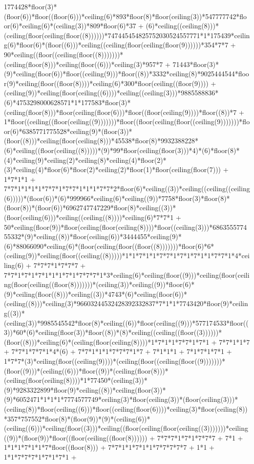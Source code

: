 1774428*floor(3)*(floor(6))*floor((floor(6)))*ceiling(6)*893*floor(8)*floor(ceiling(3))*547777742*floor(6)*ceiling(6)*(ceiling(3))*809*floor(6)*37 + (6)*ceiling((ceiling(8)))*(ceiling(floor(ceiling(floor((8))))))*747445454825752030524557771*1*175439*ceiling(6)*floor(6)*(floor((6)))*ceiling((ceiling(floor(ceiling(floor(9))))))*354*7*7 + 90*ceiling((floor((ceiling(floor((8)))))))*(ceiling(floor(8)))*ceiling(floor((6)))*ceiling(3)*957*7 + 71443*floor(3)*(9)*ceiling(floor(6))*floor((ceiling(9)))*floor((8))*3332*ceiling(8)*9025444544*floor(9)*ceiling(floor((floor(8))))*ceiling(6)*300*floor(ceiling((floor(9)))) + (ceiling(9))*ceiling(floor(ceiling((6))))*ceiling((ceiling(3)))*9885588836*(6)*4753298000628571*1*177583*floor(3)*(ceiling(floor(8)))*floor(ceiling(floor(6)))*floor((floor(ceiling(9))))*floor((8))*7 + 1*floor((ceiling((floor(ceiling((9)))))))*floor((floor(ceiling(floor((ceiling(9)))))))*floor(6)*6385771775528*ceiling(9)*(floor(3))*(floor((8)))*ceiling(floor(ceiling(8)))*45538*floor(8)*9932388228*(6)*ceiling((floor(ceiling((8)))))*(9)*99*floor(ceiling(floor(3)))*4)*(6)*floor(8)*(4)*ceiling(9)*ceiling(2)*ceiling(8)*ceiling(4)*floor(2)*(3)*ceiling(4)*floor(6)*floor(2)*ceiling(2)*floor(1)*floor(ceiling(floor(7))) + 1*7*1*1 + 7*7*1*1*1*1*7*7*1*7*7*1*1*1*7*7*2*floor(6)*ceiling((3))*ceiling((ceiling((ceiling(6)))))*(floor(6))*(6)*999966*ceiling(6)*ceiling((9))*7758*floor(3)*floor(8)*(floor(8))*(floor(6))*6962747747229*floor(8)*ceiling((3))*(floor(ceiling(6)))*ceiling((ceiling((8))))*ceiling(6)*7*7*1 + 50*ceiling(floor(9))*floor(ceiling(floor(ceiling(8))))*floor((ceiling(3)))*686355577455332*(9)*ceiling((8))*floor(ceiling(6))*3444455*ceiling(9)*(6)*88066090*ceiling(6)*(floor(ceiling(floor((floor((8)))))))*floor(6)*6*(ceiling(9))*ceiling(floor((ceiling((8)))))*1*1*7*1*1*7*7*1*7*1*7*1*1*7*7*1*4*ceiling(6) + 7*7*7*1*7*7*7 + 7*7*1*7*1*7*1*1*1*7*1*7*7*7*1*3*ceiling(6)*ceiling(floor((9)))*ceiling(floor(ceiling(floor(ceiling((floor(8)))))))*(ceiling(3))*ceiling((9))*floor(6)*(9)*ceiling(floor((8)))*ceiling((3))*4743*(6)*ceiling(floor(6))*(ceiling((8)))*ceiling(3)*96603244532428392332837*7*1*1*7743420*floor(9)*ceiling((3))*(ceiling(3))*9985545542*floor(8)*ceiling((6))*floor(ceiling((9)))*577174533*floor((3))*60*(6)*ceiling(floor(3))*floor((8))*(8)*ceiling((ceiling((floor((3))))))*(floor((8)))*ceiling(6)*(ceiling(floor(ceiling(8))))*1*7*1*1*7*7*1*7*1 + 7*7*1*1*7 + 7*7*1*7*7*1*4*(6) + 7*7*1*1*1*7*7*7*1*7 + 7*1*1*1 + 7*1*7*1*7*1 + 1*7*7*(3)*ceiling(floor((ceiling(9))))*(ceiling(floor((ceiling(floor((9)))))))*(floor((9)))*(ceiling((6)))*floor((9))*(ceiling(floor(8)))*(ceiling(floor(ceiling(8))))*1*77450*(ceiling(3))*(9)*9283322899*floor(9)*ceiling((8))*ceiling(floor(3))*(9)*6052471*1*1*1*7774577749*ceiling(3)*floor(ceiling(3))*(floor(ceiling(3)))*(ceiling(8))*floor(ceiling((6)))*floor((ceiling(floor(6))))*ceiling(3)*floor(ceiling(8))*357*757552*floor(8)*(floor(9))*(9)*(ceiling(6))*(ceiling((6)))*ceiling(floor((3)))*ceiling((floor(ceiling(floor(ceiling((3)))))))*ceiling((9))*(floor(9))*floor((floor(ceiling((floor(8)))))) + 7*7*7*1*7*1*7*7*7 + 7*1 + 1*1*1*7*1*1*7*floor((floor(8))) + 7*7*1*1*7*1*1*7*7*7*7*7 + 1*1 + 1*1*7*7*7*1*7*1*7*1 + 